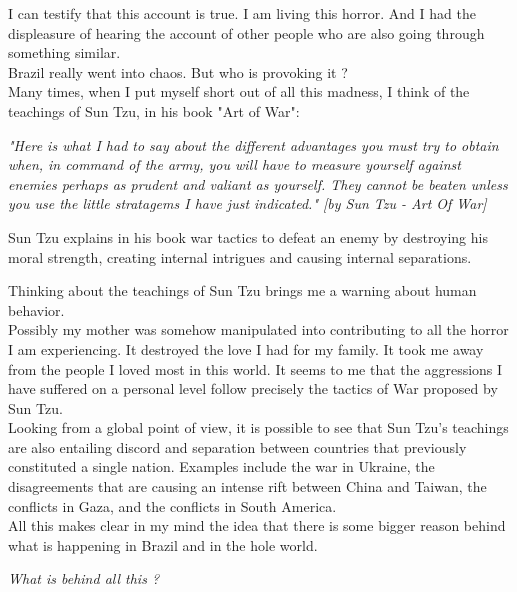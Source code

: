 \documentclass[11pt]{book}
\begin{document}
\noindent I can testify that this account is true. I am living this horror. And I had the displeasure of hearing the account of other people who are also going through something similar. \\

\noindent Brazil really went into chaos. But who is provoking it ? \\

\noindent Many times, when I put myself short out of all this madness, I think of the teachings of Sun Tzu, in his book "Art of War":

\noindent \begin{center} \emph{"Here is what I had to say about the different advantages you must try to obtain when, in command of the army, you will have to measure yourself against enemies perhaps as prudent and valiant as yourself. They cannot be beaten unless you use the little stratagems I have just indicated."
[by Sun Tzu - Art Of War]} \end{center}

\noindent Sun Tzu explains in his book war tactics to defeat an enemy by destroying his moral strength, creating internal intrigues and causing internal separations.

\noindent Thinking about the teachings of Sun Tzu brings me a warning about human behavior. \\

\noindent Possibly my mother was somehow manipulated into contributing to all the horror I am experiencing. It destroyed the love I had for my family. It took me away from the people I loved most in this world. It seems to me that the aggressions I have suffered on a personal level follow precisely the tactics of War proposed by Sun Tzu. \\

\noindent Looking from a global point of view, it is possible to see that Sun Tzu's teachings are also entailing discord and separation between countries that previously constituted a single nation. Examples include the war in Ukraine, the disagreements that are causing an intense rift between China and Taiwan, the conflicts in Gaza, and the conflicts in South America. \\

\noindent All this makes clear in my mind the idea that there is some bigger reason behind what is happening in Brazil and in the hole world.

\noindent \begin{center} \emph{What is behind all this ?} \end{center}
\end{document}

